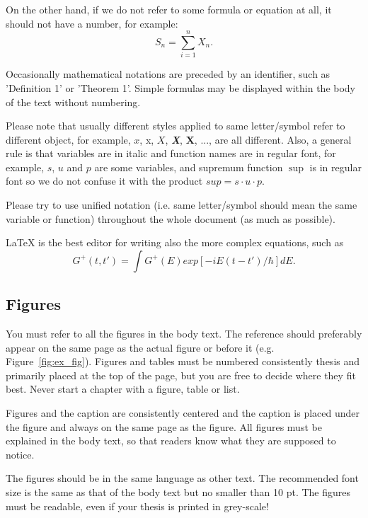 On the other hand, if we do not refer to some formula or equation at all, it should not have a number, for example:
\[
S_n=\sum_{i=1}^n X_n.
\]

Occasionally mathematical notations are preceded by an
identifier, such as 'Definition 1' or 'Theorem 1'. Simple formulas may 
be displayed within the body of the text without numbering.

Please note that usually different styles applied to same letter/symbol refer to different object, for example, $x$, x, $X$, \textit{\textbf{X}}, $\mathbf{X}$, ..., are all different. Also, a general rule is that variables are in italic and function names are in regular font, for example, $s$, $u$ and $p$ are some variables, and supremum function $\sup$ is in regular font so we do not confuse it with the product $sup=s\cdot u\cdot p$. 

Please try to use unified notation (i.e. same letter/symbol should mean the same variable or function) throughout the whole document (as much as possible).


LaTeX is the best editor for writing also the more complex equations, such as
\begin{equation}
  \label{eq:fourier}
  G^+(t,t')= \int G^+(E) exp[-iE(t-t')/\hbar] dE.
\end{equation}


\subsection{Figures}

You must refer to all the figures in the body text. The reference
should preferably appear on the same page as the actual figure or
before it (e.g. Figure~\ref{fig:ex_fig}). Figures and tables must be numbered consistently thesis
and primarily placed at the top of the page, but you are free to
decide where they fit best. Never start a chapter with a figure, table
or list.

Figures and the caption are consistently centered  and the caption is 
placed under the figure and always on the same page as the figure. 
All figures must be explained in the body text, so that readers know 
what they are supposed to notice. 

The figures should be in the same language as other text. The recommended 
font size is the same as that of the body text but no smaller than 10 pt. 
The figures must be readable, even if your thesis is printed in grey-scale!

